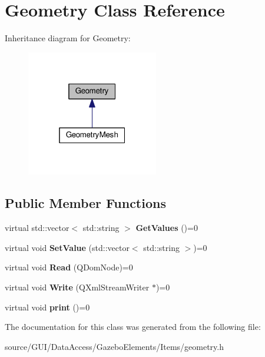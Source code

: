 \section{Geometry Class Reference}
\label{class_geometry}


Inheritance diagram for Geometry\+:\nopagebreak
\begin{figure}[H]
\begin{center}
\leavevmode
\includegraphics[width=163pt]{class_geometry__inherit__graph}
\end{center}
\end{figure}
\subsection*{Public Member Functions}
\begin{DoxyCompactItemize}
\item 
virtual std\+::vector$<$ std\+::string $>$ {\bfseries Get\+Values} ()=0\label{class_geometry_a7c68940b4f3d1764dd91afe3bcd5f87e}

\item 
virtual void {\bfseries Set\+Value} (std\+::vector$<$ std\+::string $>$)=0\label{class_geometry_a246774a9bd7a73c5021ab98a15046166}

\item 
virtual void {\bfseries Read} (Q\+Dom\+Node)=0\label{class_geometry_a35df676083cef34352d57be2f3bd9968}

\item 
virtual void {\bfseries Write} (Q\+Xml\+Stream\+Writer $\ast$)=0\label{class_geometry_a10f1baa51a7eca7db0706394357c0718}

\item 
virtual void {\bfseries print} ()=0\label{class_geometry_af72b7fa29b9031544da658cda312684f}

\end{DoxyCompactItemize}


The documentation for this class was generated from the following file\+:\begin{DoxyCompactItemize}
\item 
source/\+G\+U\+I/\+Data\+Access/\+Gazebo\+Elements/\+Items/geometry.\+h\end{DoxyCompactItemize}
